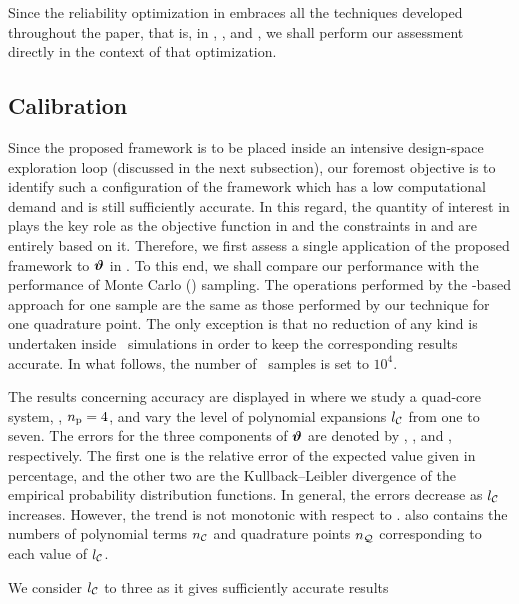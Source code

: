 Since the reliability optimization in  embraces all the techniques developed throughout the paper, that is, in , , and , we shall perform our assessment directly in the context of that optimization.

\subsection{Calibration} 
Since the proposed framework is to be placed inside an intensive design-space exploration loop (discussed in the next subsection), our foremost objective is to identify such a configuration of the framework which has a low computational demand and is still sufficiently accurate.
In this regard, the quantity of interest in  plays the key role as the objective function in  and the constraints in  and  are entirely based on it.
Therefore, we first assess a single application of the proposed framework to $\bm{\vartheta}$ in .
To this end, we shall compare our performance with the performance of Monte Carlo (\MC) sampling.
The operations performed by the \MC-based approach for one sample are the same as those performed by our technique for one quadrature point.
The only exception is that no reduction of any kind is undertaken inside \MC\ simulations in order to keep the corresponding results accurate.
In what follows, the number of \MC\ samples is set to $10^4$.


The results concerning accuracy are displayed in  where we study a quad-core system, \ie, ${n_\text{p}} = 4$, and vary the level of polynomial expansions ${l_\mathcal{C}}$ from one to seven.
The errors for the three components of $\bm{\vartheta}$ are denoted by \errorE, \errorQ, and \errorT, respectively.
The first one is the relative error of the expected value given in percentage, and the other two are the Kullback--Leibler divergence of the empirical probability distribution functions.
In general, the errors decrease as ${l_\mathcal{C}}$ increases.
However, the trend is not monotonic with respect to \errorE.
 also contains the numbers of polynomial terms ${n_\mathcal{C}}$ and quadrature points ${n_\mathcal{Q}}$ corresponding to each value of ${l_\mathcal{C}}$.

We consider ${l_\mathcal{C}}$ to three as it gives sufficiently accurate results

